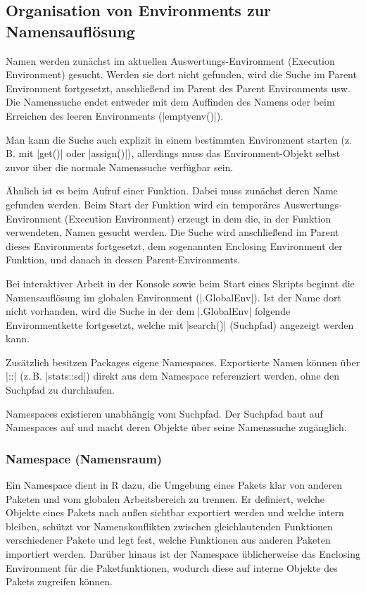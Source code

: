 \documentclass[10pt,twocolumn]{scrartcl}
\renewcommand{\lstinline}{\mycoloredinline}
\begin{document}
\subsection{Organisation von Environments zur Namensauflösung}

Namen werden zunächst im aktuellen Auswertungs-Environment (Execution Environment) gesucht. Werden sie dort nicht gefunden, wird die Suche im Parent Environment fortgesetzt, anschließend im Parent des Parent Environments usw. Die Namenssuche endet entweder mit dem Auffinden des Namens oder beim Erreichen des leeren Environments (\lstinline|emptyenv()|).

Man kann die Suche auch explizit in einem bestimmten Environment starten (z.\,B. mit \lstinline|get()| oder \lstinline|assign()|), allerdings muss das Environment-Objekt selbst zuvor über die normale Namenssuche verfügbar sein.

Ähnlich ist es beim Aufruf einer Funktion. Dabei muss zunächst deren Name gefunden werden. Beim Start der Funktion wird ein temporäres Auswertungs-Environment (Execution Environment) erzeugt in dem die, in der Funktion verwendeten, Namen gesucht werden. Die Suche wird anschließend im Parent dieses Environments fortgesetzt, dem sogenannten Enclosing Environment der Funktion, und danach in dessen Parent-Environments.

Bei interaktiver Arbeit in der Konsole sowie beim Start eines Skripts beginnt die Namensauflösung im globalen Environment (\lstinline|.GlobalEnv|). Ist der Name dort nicht vorhanden, wird die Suche in der dem \lstinline|.GlobalEnv| folgende Environmentkette fortgesetzt, welche mit \lstinline|search()| (Suchpfad) angezeigt werden kann.

Zusätzlich besitzen Packages eigene Namespaces. Exportierte Namen können über \lstinline|::| (z.\,B. \lstinline|stats::sd|) direkt aus dem Namespace referenziert werden, ohne den Suchpfad zu durchlaufen.

Namespaces existieren unabhängig vom Suchpfad. Der Suchpfad baut auf Namespaces auf und macht deren Objekte über seine Namenssuche zugänglich.


\subsubsection{Namespace (Namensraum)}

Ein Namespace dient in R dazu, die Umgebung eines Pakets klar von anderen Paketen und vom globalen Arbeitsbereich zu trennen. Er definiert, welche Objekte eines Pakets nach außen sichtbar exportiert werden und welche intern bleiben, schützt vor Namenskonflikten zwischen gleichlautenden Funktionen verschiedener Pakete und legt fest, welche Funktionen aus anderen Paketen importiert werden. Darüber hinaus ist der Namespace üblicherweise das Enclosing Environment für die Paketfunktionen, wodurch diese auf interne Objekte des Pakets zugreifen können.
\end{document}
